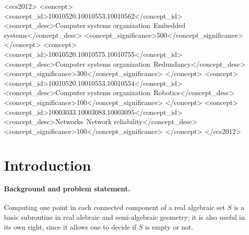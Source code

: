 \documentclass[sigconf]{acmart}
\begin{document}
\begin{CCSXML}
<ccs2012>
 <concept>
  <concept_id>10010520.10010553.10010562</concept_id>
  <concept_desc>Computer systems organization~Embedded systems</concept_desc>
  <concept_significance>500</concept_significance>
 </concept>
 <concept>
  <concept_id>10010520.10010575.10010755</concept_id>
  <concept_desc>Computer systems organization~Redundancy</concept_desc>
  <concept_significance>300</concept_significance>
 </concept>
 <concept>
  <concept_id>10010520.10010553.10010554</concept_id>
  <concept_desc>Computer systems organization~Robotics</concept_desc>
  <concept_significance>100</concept_significance>
 </concept>
 <concept>
  <concept_id>10003033.10003083.10003095</concept_id>
  <concept_desc>Networks~Network reliability</concept_desc>
  <concept_significance>100</concept_significance>
 </concept>
</ccs2012>
\end{CCSXML}


\setcounter{secnumdepth}{4}
\renewcommand{\theparagraph}{\thesubsection.\arabic{paragraph}}
\titleformat{\paragraph}[runin]{\normalfont\normalsize\bfseries}{\theparagraph.}{1em}{}
\titlespacing*{\paragraph}{0em}{1ex}{1em}
\newcommand{\pref}[1]{{\bf\ref{#1}}}


\maketitle


\section{Introduction}


\paragraph*{Background and problem statement.}
Computing one point in each connected component of a real algebraic
set $S$ is a basic subroutine in real alebraic and semi-algebraic
geometry; it is also useful in its own right, since it allows one to
decide if $S$ is empty or not. 
\end{document}
